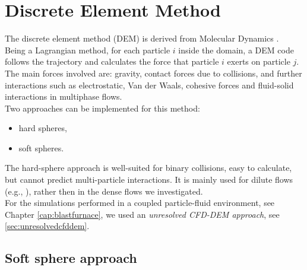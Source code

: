 
\chapter{Discrete Element Method}
\label{cap:dem}

The discrete element method (\acs{DEM}) is derived from Molecular Dynamics
\cite{RefWorks:133, RefWorks:137}.
\\
Being a Lagrangian method, for each particle $i$ inside the domain, a \acs{DEM}
code follows the trajectory and calculates the force that particle $i$ exerts on
particle $j$.
The main forces involved are: gravity, contact forces due to collisions, and
further interactions such as electrostatic, Van der Waals, cohesive forces and fluid-solid interactions in 
multiphase flows. \\
Two approaches can be implemented for this method:
\begin{itemize}
  \item{hard spheres,}
  \item{soft spheres.}
\end{itemize} 
The hard-sphere approach is well-suited for binary collisions, easy to
calculate, but cannot predict multi-particle interactions.
It is mainly used for dilute flows (e.g., \citet{RefWorks:78, RefWorks:122,
RefWorks:151, RefWorks:152}), rather then in the dense flows we investigated.\\
For the simulations performed in a coupled particle-fluid environment, see
Chapter \ref{cap:blastfurnace}, we used an \textit{unresolved
\acs{CFD}-\acs{DEM} approach}, see \ref{sec:unresolvedcfddem}.


\section{Soft sphere approach}
\label{sec:softspheresapproach}

